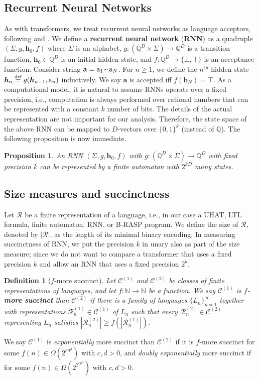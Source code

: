 \documentclass{article} %
\newtheorem{proposition}[theorem]{Proposition}
\newtheorem{definition}[theorem]{Definition}
\newcommand{\Q}{\mathbb{Q}}
\newcommand{\N}{\mathbb{N}}
\newcommand{\defeq}{\mathrel{\stackrel{\textnormal{\tiny def}}{=}}}
\newcommand{\defn}[1]{\textbf{#1}}
\newcommand{\sym}[1]{\mathrm{#1}}
\newcommand{\str}[1]{#1}
\newcommand{\alphabet}{\Sigma}
\newcommand{\bword}{\mathbf{a}}
\newcommand{\bh}{\boldsymbol{h}}
\newcommand{\bhinit}{\bh_0}
\newcommand{\rnnstep}{g}
\newcommand{\rnnout}{f}
\newcommand{\Lang}{L}
\newcommand{\classC}{\mathcal{C}}
\newcommand{\rep}{\mathcal{R}}
\newcommand{\mydots}{%
  \ifmmode
    \mathord{.}\mkern-1mu\mathord{.}\mkern-1mu\mathord{.}%
  \else
    .\kern-0.1em.\kern-0.1em.%
  \fi
}
\newcommand{\mycdots}{%
  \ifmmode
    \mathord{\raisebox{0.45ex}{\ensuremath{\mydots}}}\mkern2mu%
  \else
    \raisebox{0.45ex}{.\kern-0.1em.\kern-0.1em.}\kern0.1em%
  \fi
}
\renewcommand{\cdots}{\mycdots}%
\begin{document}
\subsection{Recurrent Neural Networks}
As with transformers, we treat recurrent neural networks as language acceptors, following \citet{RNN-hierarchy} and \citet{WGY18,WGY24}. 
We define a \defn{recurrent neural network} (\defn{RNN}) as a quadruple $(\alphabet, \rnnstep, \bhinit, \rnnout)$ where $\alphabet$ is an alphabet, $\rnnstep \colon (\Q^D \times \alphabet) \to \Q^D$ is a transition function, $\bhinit \in \Q^D$ is an initial hidden state, and $\rnnout \colon \Q^D \rightarrow \{\bot, \top\}$ is an acceptance function.
Consider string $\str{\bword} = \sym{a}_1 \cdots \sym{a}_N$.
For $n \geq 1$, we define the $n^{\text{th}}$ hidden state $\bh_n \defeq \rnnstep(\bh_{n-1}, \sym{a}_n)$ inductively.
We say $\str{\bword}$ is accepted iff $\rnnout(\bh_N) = \top$.
As a computational model, it is natural to assume RNNs operate over a fixed precision,
i.e., computation is always performed over rational numbers that can be represented with
a constant $k$ number of bits. 
The details of the actual representation are
not important for our analysis. Therefore, the state space of the above
RNN can be mapped to $D$-vectors over $\{0,1\}^k$ (instead of $\Q$). The
following proposition is now immediate.
\begin{proposition}
    An RNN $(\alphabet, \rnnstep, \bhinit, \rnnout)$ with $\rnnstep \colon (\Q^D \times \alphabet) \to \Q^D$ with fixed precision $k$
    can be represented by a finite automaton with $2^{kD}$ many states.
    \label{prop:rnn-dfa}
\end{proposition}

\subsection{Size measures and succinctness}\label{subsec:size}
Let $\rep$ be a finite representation of a language, i.e.,
in our case a UHAT, LTL formula, finite automaton, RNN, or B-RASP program.
We define the size of $\rep$, denoted by $|\rep|$, as the length of its minimal binary encoding.
In measuring succinctness of RNN, we put the precision $k$ in unary also as part of the
size measure; since we do not want to compare a transformer that uses a
fixed precision $k$ and allow an RNN that uses a fixed precision $2^k$.
\begin{definition}[$f$-more succinct]\label{def:succinctness}
Let $\classC^{(1)}$ and $\classC^{(2)}$ be classes of finite representations of languages, and let $f \colon \N \to \N$ be a function. 
We say $\classC^{(1)}$ is $f$-\defn{more succinct} than $\classC^{(2)}$ if there is a family of languages $\{\Lang_n\}_{n=1}^\infty$ together with representations $\rep_n^{(1)} \in \classC^{(1)}$ of $\Lang_n$ such that every $\rep_n^{(2)} \in \classC^{(2)}$ representing $\Lang_n$ satisfies $|\rep_n^{(2)}| \ge f(|\rep_n^{(1)}|)$.
\end{definition}
 We say $\classC^{(1)}$ is \emph{exponentially} more succinct than $\classC^{(2)}$ if it is $f$-more succinct for some $f(n) \in \Omega(2^{cn^{d}})$ with $c,d > 0$, and \emph{doubly exponentially} more succinct if for some $f(n) \in \Omega(2^{2^{c n^{d}}})$ with $c,d > 0$.
\end{document}
